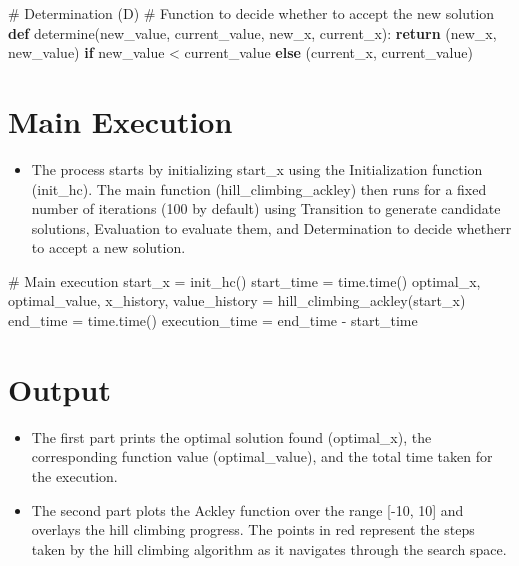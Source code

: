 \documentclass[
  letterpaper,
  DIV=11,
  numbers=noendperiod]{scrreprt}
\newenvironment{Shaded}{\begin{snugshade}}{\end{snugshade}}
\newcommand{\CommentTok}[1]{\textcolor[rgb]{0.37,0.37,0.37}{#1}}
\newcommand{\ControlFlowTok}[1]{\textcolor[rgb]{0.00,0.23,0.31}{\textbf{#1}}}
\newcommand{\KeywordTok}[1]{\textcolor[rgb]{0.00,0.23,0.31}{\textbf{#1}}}
\newcommand{\NormalTok}[1]{\textcolor[rgb]{0.00,0.23,0.31}{#1}}
\newcommand{\OperatorTok}[1]{\textcolor[rgb]{0.37,0.37,0.37}{#1}}
\providecommand{\tightlist}{%
  \setlength{\itemsep}{0pt}\setlength{\parskip}{0pt}}\usepackage{longtable,booktabs,array}
\begin{document}
\begin{Shaded}
\begin{Highlighting}[]
\CommentTok{\# Determination (D)}
\CommentTok{\# Function to decide whether to accept the new solution}
\KeywordTok{def}\NormalTok{ determine(new\_value, current\_value, new\_x, current\_x):}
    \ControlFlowTok{return}\NormalTok{ (new\_x, new\_value) }\ControlFlowTok{if}\NormalTok{ new\_value }\OperatorTok{\textless{}}\NormalTok{ current\_value }\ControlFlowTok{else}\NormalTok{ (current\_x, current\_value)}
\end{Highlighting}
\end{Shaded}

\section{Main Execution}\label{main-execution-1}

\begin{itemize}
\tightlist
\item
  The process starts by initializing start\_x using the Initialization
  function (init\_hc). The main function (hill\_climbing\_ackley) then
  runs for a fixed number of iterations (100 by default) using
  Transition to generate candidate solutions, Evaluation to evaluate
  them, and Determination to decide whetherr to accept a new solution.
\end{itemize}

\begin{Shaded}
\begin{Highlighting}[]
\CommentTok{\# Main execution}
\NormalTok{start\_x }\OperatorTok{=}\NormalTok{ init\_hc()}
\NormalTok{start\_time }\OperatorTok{=}\NormalTok{ time.time()}
\NormalTok{optimal\_x, optimal\_value, x\_history, value\_history }\OperatorTok{=}\NormalTok{ hill\_climbing\_ackley(start\_x)}
\NormalTok{end\_time }\OperatorTok{=}\NormalTok{ time.time()}
\NormalTok{execution\_time }\OperatorTok{=}\NormalTok{ end\_time }\OperatorTok{{-}}\NormalTok{ start\_time}
\end{Highlighting}
\end{Shaded}

\section{Output}\label{output-1}

\begin{itemize}
\tightlist
\item
  The first part prints the optimal solution found (optimal\_x), the
  corresponding function value (optimal\_value), and the total time
  taken for the execution.
\item
  The second part plots the Ackley function over the range {[}-10, 10{]}
  and overlays the hill climbing progress. The points in red represent
  the steps taken by the hill climbing algorithm as it navigates through
  the search space.
\end{itemize}
\end{document}
